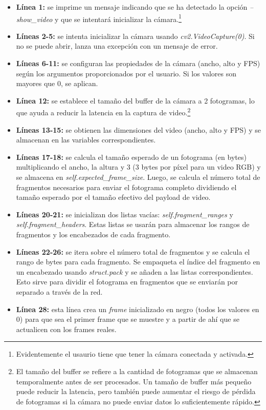 \begin{itemize}
    \item \textbf{Línea 1:} se imprime un mensaje indicando que se ha detectado la opción \textit{--show\_video} y que se intentará inicializar la cámara.\footnote{Evidentemente el usaurio tiene que tener la cámara conectada y activada.}
    \item \textbf{Líneas 2-5:} se intenta inicializar la cámara usando \textit{cv2.VideoCapture(0)}. Si no se puede abrir, lanza una excepción con un mensaje de error.
    \item \textbf{Líneas 6-11:} se configuran las propiedades de la cámara (ancho, alto y FPS) según los argumentos proporcionados por el usuario. Si los valores son mayores que 0, se aplican.
    \item \textbf{Línea 12:} se establece el tamaño del buffer de la cámara a 2 fotogramas, lo que ayuda a reducir la latencia en la captura de video.\footnote{El tamaño del buffer se refiere a la cantidad de fotogramas que se almacenan temporalmente antes de ser procesados. Un tamaño de buffer más pequeño puede reducir la latencia, pero también puede aumentar el riesgo de pérdida de fotogramas si la cámara no puede enviar datos lo suficientemente rápido.}
    \item \textbf{Líneas 13-15:} se obtienen las dimensiones del video (ancho, alto y FPS) y se almacenan en las variables correspondientes.
    \item \textbf{Líneas 17-18:} se calcula el tamaño esperado de un fotograma (en bytes) multiplicando el ancho, la altura y 3 (3 bytes por píxel para un video RGB) y se almacena en \textit{self.expected\_frame\_size}. Luego, se calcula el número total de fragmentos necesarios para enviar el fotograma completo dividiendo el tamaño esperado por el tamaño efectivo del payload de video.
    \item \textbf{Líneas 20-21:} se inicializan dos listas vacías: \textit{self.fragment\_ranges} y \textit{self.fragment\_headers}. Estas listas se usarán para almacenar los rangos de fragmentos y los encabezados de cada fragmento.
    \item \textbf{Líneas 22-26:} se itera sobre el número total de fragmentos y se calcula el rango de bytes para cada fragmento. Se empaqueta el índice del fragmento en un encabezado usando \textit{struct.pack} y se añaden a las listas correspondientes. Esto sirve para dividir el fotograma en fragmentos que se enviarán por separado a través de la red.
    \item \textbf{Línea 28:} esta línea crea un \textit{frame} inicializado en negro (todos los valores en 0) para que sea el primer frame que se muestre y a partir de ahí que se actualicen con los frames reales.

\end{itemize}
